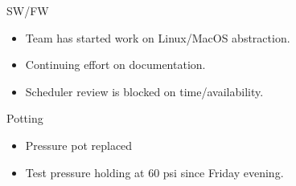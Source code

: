 \begin{frame}{SW/FW}
    \begin{itemize}
      \item Team has started work on Linux/MacOS abstraction.
      \item Continuing effort on documentation.
      \item Scheduler review is blocked on time/availability.
    \end{itemize}
\end{frame}

\begin{frame}{Potting}
  \begin{itemize}
    \item Pressure pot replaced
    \item Test pressure holding at 60 psi since Friday evening.
  \end{itemize}
\end{frame}




